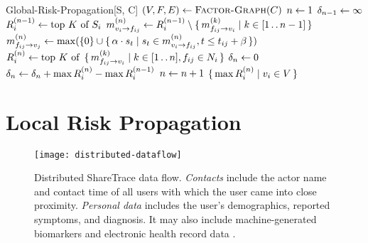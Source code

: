 %
\begin{function}{Global-Risk-Propagation}[S, C]
\State $(\vVariables, \vFactors, \vEdges) \assign \Call{Factor-Graph}{C}$
\State $n \leftarrow 1$
\State $\delta_{n - 1} \leftarrow \infty$
\ForEach{$\vVariable[i] \in \vVariables$}
	\State $R_{i}^{(n - 1)} \leftarrow \text{top } K \text{ of } S_i$
\EndFor
{}
	\ForEach{$\{\vVariable[i], \vFactor[ij]\} \in \vEdges$}
		\State $\vVariableMsg{i}{ij}{n} \assign \scores{i}{n - 1} \setminus \setbuilder{\vFactorMsg{ij}{i}{k}}{k \in [1 \ltwodots n - 1]}$
	\EndFor
	\ForEach{$\{\vVariable[i], \vFactor[ij]\} \in \vEdges$}
		\State $\vFactorMsg{ij}{j}{n} \assign \max (\{0\} \cup \setbuilder{\pTransRate \cdot \vScore_\vTime}{\vScore_\vTime \in \vVariableMsg{i}{ij}{n}, \vTime \leq \vTime_{ij} + \pTimeBuffer})$
	\EndFor
	\ForEach{$\vVariable[i] \in \vVariables$}
		\State $\scores{i}{n} \assign \topk{\setbuilder{\vFactorMsg{ij}{i}{k}}{k \in [1 \ltwodots n], \vFactor[ij] \in \neighbors_i}}$
	\EndFor
	\State $\delta_{n} \leftarrow 0$
	\ForEach{$\vVariable[i] \in \vVariables$}
		\State $\delta_{n} \leftarrow \delta_{n} + \max R_{i}^{(n)} - \max R_{i}^{(n - 1)}$
	\EndFor
	\State $n \leftarrow n + 1$
\EndWhile
\State \Return $\setbuilder{\max \scores{i}{n}}{\vVariable[i] \in \vVariables}$
\end{function}

\section{Local Risk Propagation}\label{sec:vertices-to-actors}

\begin{figure}[htb]
    \texttt{[image: distributed-dataflow]}
    \caption[Distributed ShareTrace data flow]{Distributed ShareTrace data flow. \emph{Contacts} include the actor name and contact time of all users with which the user came into close proximity. \emph{Personal data} includes the user's demographics, reported symptoms, and diagnosis. It may also include machine-generated biomarkers and electronic health record data
    \cite{Ayday2020}.}
    \label{fig:distributed-dataflow}
\end{figure}

